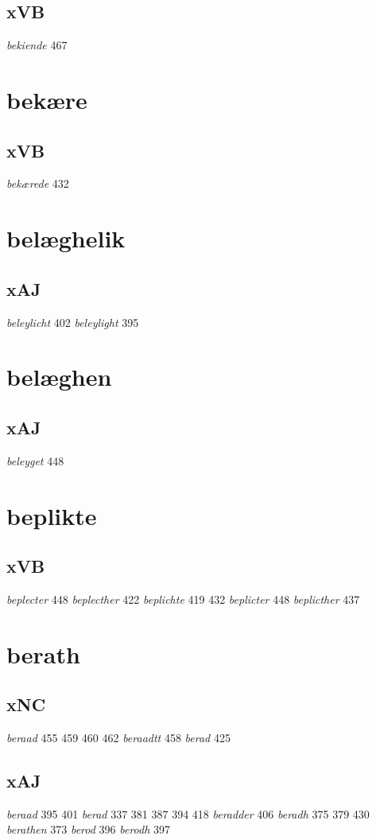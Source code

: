\documentclass[a4paper,twocolumn]{article}
\begin{document}
\subsection{xVB}
\label{sec:org869acec}
\emph{bekiende} 467 
\section{bekære}
\label{sec:org68778b0}
\subsection{xVB}
\label{sec:orge656eb8}
\emph{bekærede} 432 
\section{belæghelik}
\label{sec:org4f13ed4}
\subsection{xAJ}
\label{sec:orgc031834}
\emph{beleylicht} 402 \emph{beleylight} 395 
\section{belæghen}
\label{sec:org0dfb1c9}
\subsection{xAJ}
\label{sec:orge3b5f3d}
\emph{beleyget} 448 
\section{beplikte}
\label{sec:orgdbd5190}
\subsection{xVB}
\label{sec:org87fc9e8}
\emph{beplecter} 448 \emph{beplecther} 422 \emph{beplichte} 419 432 \emph{beplicter} 448 \emph{beplicther} 437 
\section{berath}
\label{sec:org916adc8}
\subsection{xNC}
\label{sec:org2b1cf02}
\emph{beraad} 455 459 460 462 \emph{beraadtt} 458 \emph{berad} 425 
\subsection{xAJ}
\label{sec:org199f643}
\emph{beraad} 395 401 \emph{berad} 337 381 387 394 418 \emph{beradder} 406 \emph{beradh} 375 379 430 \emph{berathen} 373 \emph{berod} 396 \emph{berodh} 397 
\end{document}
